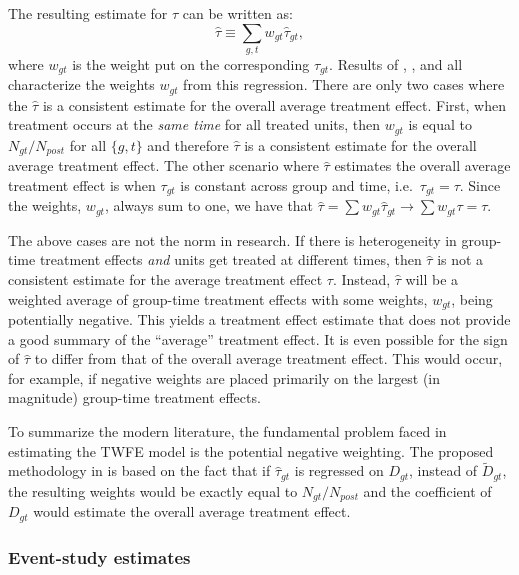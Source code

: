 The resulting estimate for \(\tau\) can be written as: \[
\hat{\tau} \equiv \sum_{g,t} w_{gt} \hat{\tau}_{gt},
\] where \(w_{gt}\) is the weight put on the corresponding
\(\hat{\tau}_{gt}\). Results of \citet{Gardner_2021},
\citet{Borusyak_Jaravel_Spiess_2021}, and
\citet{deChaisemartin_DHaultfoeuille_2019} all characterize the weights
\(w_{gt}\) from this regression. There are only two cases where the
\(\hat{\tau}\) is a consistent estimate for the overall average
treatment effect. First, when treatment occurs at the \emph{same time}
for all treated units, then \(w_{gt}\) is equal to \(N_{gt}/N_{post}\)
for all \(\{g, t\}\) and therefore \(\hat{\tau}\) is a consistent
estimate for the overall average treatment effect. The other scenario
where \(\hat{\tau}\) estimates the overall average treatment effect is
when \(\tau_{gt}\) is constant across group and time,
i.e.~\(\tau_{gt} = \tau\). Since the weights, \(w_{gt}\), always sum to
one, we have that
\(\hat{\tau} = \sum w_{gt} \hat{\tau}_{gt} \to \sum w_{gt} \tau = \tau\).

The above cases are not the norm in research. If there is heterogeneity
in group-time treatment effects \emph{and} units get treated at
different times, then \(\hat{\tau}\) is not a consistent estimate for
the average treatment effect \(\tau\). Instead, \(\hat{\tau}\) will be a
weighted average of group-time treatment effects with some weights,
\(w_{gt}\), being potentially negative. This yields a treatment effect
estimate that does not provide a good summary of the ``average''
treatment effect. It is even possible for the sign of \(\hat{\tau}\) to
differ from that of the overall average treatment effect. This would
occur, for example, if negative weights are placed primarily on the
largest (in magnitude) group-time treatment effects.

To summarize the modern literature, the fundamental problem faced in
estimating the TWFE model is the potential negative weighting. The
proposed methodology in \citet{Gardner_2021} is based on the fact that
if \(\hat{\tau}_{gt}\) is regressed on \(D_{gt}\), instead of
\(\tilde{D}_{gt}\), the resulting weights would be exactly equal to
\(N_{gt}/N_{post}\) and the coefficient of \(D_{gt}\) would estimate the
overall average treatment effect.

\hypertarget{event-study-estimates}{%
\subsubsection{Event-study estimates}\label{event-study-estimates}}

